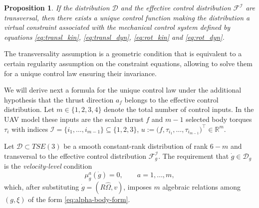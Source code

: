 \documentclass[letterpaper, 10 pt, conference]{ieeeconf}
\newtheorem{proposition}{Proposition}
\begin{document}
\begin{proposition}\label{existence:result}
If the distribution $\mathcal{D}$ and the effective control distribution $\mathcal{F}^{\mathcal{I}}$ are transversal, then there exists a unique control function making the distribution a virtual constraint associated with the mechanical control system defined by equations \eqref{eq:transl_kin}, \eqref{eq:transl_dyn}, \eqref{eq:rot_kin} and \eqref{eq:rot_dyn}.
\end{proposition}

The transversality assumption is a geometric condition that is equivalent to a certain regularity assumption on the constraint equations, allowing to solve them for a unique control law ensuring their invariance.

We will derive next a formula for the unique control law under the additional hypothesis that the thrust direction $a_{f}$ belongs to the effective control distribution. Let $m\in\{1,2,3, 4\}$ denote the total number of control inputs. In the UAV model these inputs are the scalar thrust $f$ and $m-1$ selected body torques $\tau_i$ with indices $\mathcal{I}=\{i_1,\dots,i_{m-1}\}\subseteq\{1,2,3\}$,  $u:=\big(f,\tau_{i_1},\ldots,\tau_{i_{m-1}}\big)^\top\in\mathbb{R}^m$.


Let $\mathcal{D}\subset TSE(3)$ be a smooth constant-rank distribution of rank $6-m$ and transversal to the effective control distribution $\mathcal{F}_{g}^{\mathcal{I}}$. The requirement that $\dot g\in\mathcal{D}_g$ is the \emph{velocity-level} condition
\begin{equation}\label{eq:vel_level_condition}
\mu^a_g(\dot g)=0,\qquad a=1,\dots,m,
\end{equation}
which, after substituting $\dot g=(R\widehat{\Omega},v)$, imposes $m$ algebraic relations among $(g,\xi)$ of the form \eqref{eq:alpha-body-form}.
\end{document}

